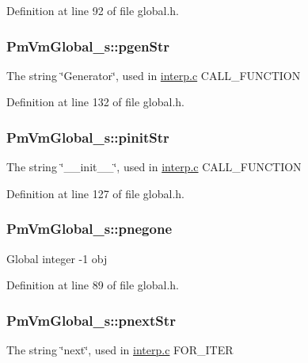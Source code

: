 Definition at line 92 of file global.\-h.

\hypertarget{struct_pm_vm_global__s_a37fbbf890405319034865738eb9da6f4}{
\subsubsection[{pgen\-Str}]{ Pm\-Vm\-Global\-\_\-s\-::pgen\-Str}}\label{struct_pm_vm_global__s_a37fbbf890405319034865738eb9da6f4}
The string \char`\"{}\-Generator\char`\"{}, used in \hyperlink{interp_8c}{interp.\-c} C\-A\-L\-L\-\_\-\-F\-U\-N\-C\-T\-I\-O\-N 

Definition at line 132 of file global.\-h.

\hypertarget{struct_pm_vm_global__s_a3f5b2b2fb7cba1e5af0afa6ff9f20e5c}{
\subsubsection[{pinit\-Str}]{ Pm\-Vm\-Global\-\_\-s\-::pinit\-Str}}\label{struct_pm_vm_global__s_a3f5b2b2fb7cba1e5af0afa6ff9f20e5c}
The string \char`\"{}\-\_\-\-\_\-init\-\_\-\-\_\-\char`\"{}, used in \hyperlink{interp_8c}{interp.\-c} C\-A\-L\-L\-\_\-\-F\-U\-N\-C\-T\-I\-O\-N 

Definition at line 127 of file global.\-h.

\hypertarget{struct_pm_vm_global__s_a973c8cde94c705c1be77dac434dc6cc7}{
\subsubsection[{pnegone}]{ Pm\-Vm\-Global\-\_\-s\-::pnegone}}\label{struct_pm_vm_global__s_a973c8cde94c705c1be77dac434dc6cc7}
Global integer -\/1 obj 

Definition at line 89 of file global.\-h.

\hypertarget{struct_pm_vm_global__s_a1d7e5d1abb3381fd54337cd18a24dee6}{
\subsubsection[{pnext\-Str}]{ Pm\-Vm\-Global\-\_\-s\-::pnext\-Str}}\label{struct_pm_vm_global__s_a1d7e5d1abb3381fd54337cd18a24dee6}
The string \char`\"{}next\char`\"{}, used in \hyperlink{interp_8c}{interp.\-c} F\-O\-R\-\_\-\-I\-T\-E\-R 

